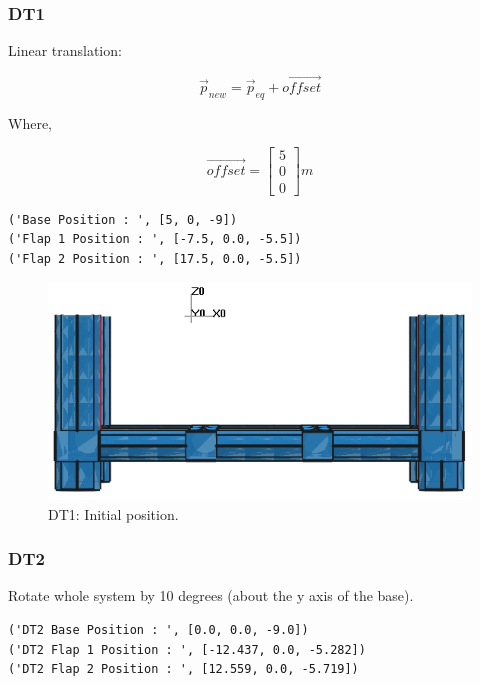 \documentclass[11pt]{article}
\begin{document}
\subsubsection{DT1}
\label{sec:orgc32ec33}

Linear translation:

\begin{equation}
\overrightarrow{p}_{new} = \overrightarrow{p}_{eq} + \overrightarrow{offset}
\end{equation}

Where,

\begin{equation}
\overrightarrow{offset} = \begin{bmatrix} 
                              5\\ 
                              0\\
                              0 
                          \end{bmatrix} m
\end{equation}

\begin{verbatim}
('Base Position : ', [5, 0, -9])
('Flap 1 Position : ', [-7.5, 0.0, -5.5])
('Flap 2 Position : ', [17.5, 0.0, -5.5])
\end{verbatim}

\begin{figure}[htbp]
\centering
\includegraphics[width=.9\linewidth]{images/system/dt1.png}
\caption{\label{fig:org99e9384}
DT1: Initial position.}
\end{figure}

\newpage
\subsubsection{DT2}
\label{sec:orge230bac}

Rotate whole system by 10 degrees (about the y axis of the base).

\begin{verbatim}
('DT2 Base Position : ', [0.0, 0.0, -9.0])
('DT2 Flap 1 Position : ', [-12.437, 0.0, -5.282])
('DT2 Flap 2 Position : ', [12.559, 0.0, -5.719])
\end{verbatim}
\end{document}
